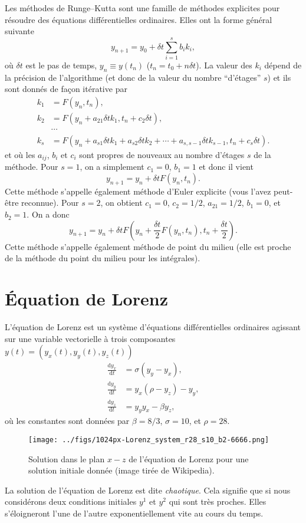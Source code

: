 \documentclass[a4paper,10pt]{article}
\newcommand{\dd}{\mathrm{d}}
\begin{document}
Les méthodes de Runge--Kutta sont une famille de méthodes explicites pour résoudre des équations 
différentielles ordinaires. Elles ont la forme général suivante
\begin{equation}
 y_{n+1}=y_0+\delta t\sum_{i=1}^s b_ik_i,
\end{equation}
où $\delta t$ est le pas de temps, $y_n\equiv y(t_n)$ ($t_n=t_0+n\delta t$). La valeur des 
$k_i$ dépend de la précision de l'algorithme (et donc de la valeur du nombre ``d'étages'' $s$) et ils sont donnés
de façon itérative par
\begin{align*}
 k_1&=F(y_n,t_n),\\
 k_2&=F(y_n+a_{21}\delta t k_1,t_n+c_2\delta t),\\
 &\cdots\\
 k_s&=F(y_n+a_{s1}\delta t k_1+a_{s2}\delta t k_2+\cdots +a_{s,s-1}\delta t k_{s-1},t_n+c_s \delta t).
\end{align*}
et où les $a_{ij}$, $b_i$ et $c_i$ sont propres de nouveaux au nombre d'étages $s$ de la méthode.
Pour $s=1$, on a simplement $c_1=0$, $b_1=1$ et donc il vient
\begin{equation*}
 y_{n+1}=y_n+\delta t F(y_n,t_n).
\end{equation*}
Cette méthode s'appelle également méthode d'Euler explicite (vous l'avez peut-être reconnue). 
Pour $s=2$, on obtient $c_1=0$, $c_2=1/2$, $a_{21}=1/2$, $b_1=0$, et $b_2=1$. On a donc
\begin{equation*}
y_{n+1}=y_n+\delta t F\left(y_n+\frac{\delta t}{2}F(y_n,t_n),t_n+\frac{\delta t}{2}\right).
\end{equation*}
Cette méthode s'appelle également méthode de point du milieu (elle est proche de la méthode du point du milieu pour les intégrales).

\section*{Équation de Lorenz}

L'équation de Lorenz est un système d'équations différentielles ordinaires agissant sur une variable
vectorielle à trois composantes $y(t)=(y_x(t),y_y(t),y_z(t))$
\begin{align*}
 \frac{\dd y_x}{\dd t}&=\sigma(y_y-y_x),\\
 \frac{\dd y_y}{\dd t}&=y_x(\rho-y_z)-y_y,\\
 \frac{\dd y_z}{\dd t}&=y_yy_x-\beta y_z,
\end{align*}
où les constantes sont données par $\beta=8/3$, $\sigma=10$, et $\rho=28$.
\begin{figure}[htp]
\begin{center}
\texttt{[image: ../figs/1024px-Lorenz\_system\_r28\_s10\_b2-6666.png]}
\caption{Solution dans le plan $x-z$ de l'équation de Lorenz pour une solution initiale donnée (image tirée de Wikipedia).}\label{fig_lorenz}
\end{center}
\end{figure}
La solution de l'équation de Lorenz est dite \textit{chaotique}. Cela signifie que
si nous considérons deux conditions initiales $y^1$ et $y^2$ qui sont très proches. 
Elles s'éloigneront l'une de l'autre exponentiellement vite au cours du temps.
\end{document}
